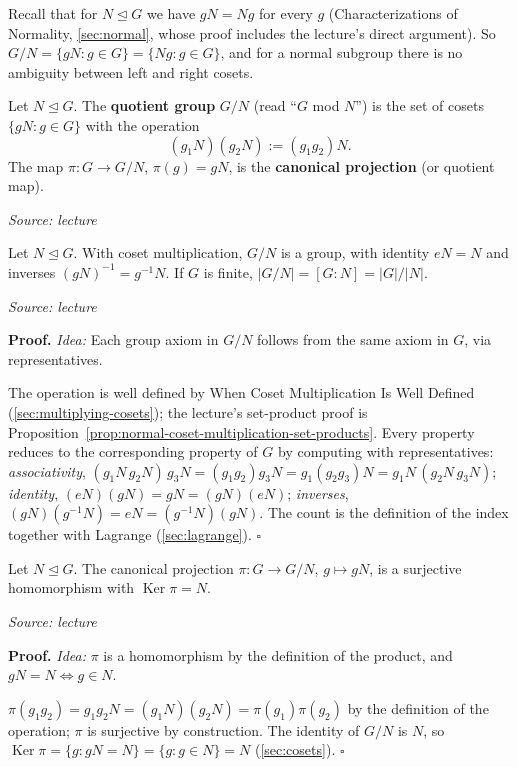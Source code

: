 \documentclass[11pt]{report}
\renewenvironment{proof}[1][Proof]{\noindent\textbf{#1.} }{\hfill$\square$\par\vspace{5pt}}
\newcommand{\srcline}[1]{\par\hfill{\footnotesize\textit{Source: #1}}}
\begin{document}
Recall that for $N \trianglelefteq G$ we have $gN = Ng$ for every $g$ (Characterizations of Normality, \ref{sec:normal}, whose proof includes the lecture's direct argument). So $G/N = \{gN : g \in G\} = \{Ng : g \in G\}$, and for a normal subgroup there is no ambiguity between left and right cosets.

\begin{defbox}\label{def:quotient-group}
Let $N \trianglelefteq G$. The \textbf{quotient group} $G/N$ (read ``$G$ mod $N$'') is the set of cosets $\{gN : g \in G\}$ with the operation
\[ (g_1N)(g_2N) := (g_1g_2)N. \]
The map $\pi: G \to G/N$, $\pi(g) = gN$, is the \textbf{canonical projection} (or quotient map).
\srcline{lecture}
\end{defbox}



\begin{thmbox}[{$G/N$ Is a Group}]\label{thm:g-n-group}
Let $N \trianglelefteq G$. With coset multiplication, $G/N$ is a group, with identity $eN = N$ and inverses $(gN)^{-1} = g^{-1}N$. If $G$ is finite, $|G/N| = [G : N] = |G|/|N|$.
\srcline{lecture}
\end{thmbox}

\begin{proof}
\textit{Idea:} Each group axiom in $G/N$ follows from the same axiom in $G$, via representatives.\par
The operation is well defined by When Coset Multiplication Is Well Defined (\ref{sec:multiplying-cosets}); the lecture's set-product proof is Proposition~\ref{prop:normal-coset-multiplication-set-products}. Every property reduces to the corresponding property of $G$ by computing with representatives: \emph{associativity}, $(g_1N\,g_2N)\,g_3N = (g_1g_2)g_3N = g_1(g_2g_3)N = g_1N\,(g_2N\,g_3N)$; \emph{identity}, $(eN)(gN) = gN = (gN)(eN)$; \emph{inverses}, $(gN)(g^{-1}N) = eN = (g^{-1}N)(gN)$. The count is the definition of the index together with Lagrange (\ref{sec:lagrange}).
\end{proof}

\begin{propbox}\label{prop:every-normal-subgroup-kernel}
Let $N \trianglelefteq G$. The canonical projection $\pi: G \to G/N$, $g \mapsto gN$, is a surjective homomorphism with $\operatorname{Ker}\pi = N$.
\srcline{lecture}
\end{propbox}

\begin{proof}
\textit{Idea:} $\pi$ is a homomorphism by the definition of the product, and $gN = N \iff g \in N$.\par
$\pi(g_1g_2) = g_1g_2N = (g_1N)(g_2N) = \pi(g_1)\pi(g_2)$ by the definition of the operation; $\pi$ is surjective by construction. The identity of $G/N$ is $N$, so $\operatorname{Ker}\pi = \{g : gN = N\} = \{g : g \in N\} = N$ (\ref{sec:cosets}).
\end{proof}
\end{document}

